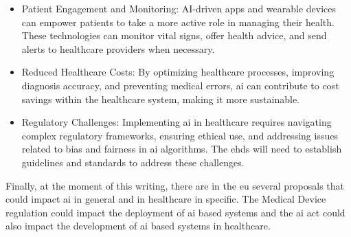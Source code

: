\begin{itemize}
\item Patient Engagement and Monitoring: AI-driven apps and wearable devices can empower patients to take a more active role in managing their health. These technologies can monitor vital signs, offer health advice, and send alerts to healthcare providers when necessary.

\item Reduced Healthcare Costs: By optimizing healthcare processes, improving diagnosis accuracy, and preventing medical errors, \ac{ai} can contribute to cost savings within the healthcare system, making it more sustainable.

\item Regulatory Challenges: Implementing \ac{ai} in healthcare requires navigating complex regulatory frameworks, ensuring ethical use, and addressing issues related to bias and fairness in \ac{ai} algorithms. The \ac{ehds} will need to establish guidelines and standards to address these challenges.

\end{itemize}


Finally, at the moment of this writing, there are in the \ac{eu} several proposals that could impact \ac{ai} in general and in healthcare in specific.
The Medical Device regulation could impact the deployment of \ac{ai} based systems and the \ac{ai} act could also impact the development of \ac{ai} based systems in healthcare.